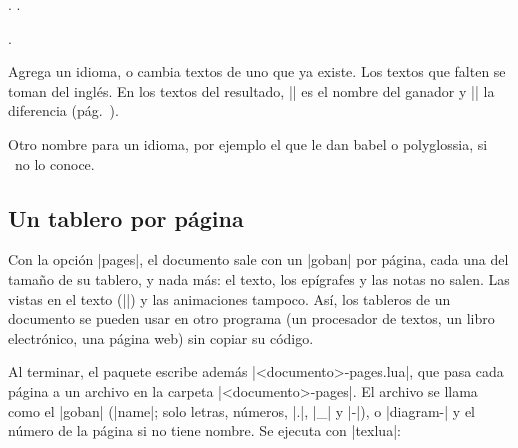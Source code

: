 \begin{goban}[9, stone = {radius = 4pt}, mark = {line = {color = red}}]
\begin{command}{\pgfgotext{}}
	\begin{codeexample}[]
		. .

		.
	\end{codeexample}
\end{command}

\begin{command}{\pgfgodefinelanguage{}}
	Agrega un idioma, o cambia textos de uno que ya existe. Los textos que falten se toman del inglés. En los textos del resultado, |\pgfgowinner| es el nombre del ganador y |\pgfgopoints| la diferencia (pág.~\pageref{subsec:sgfdiagramas}).

	\begin{codeexample}
	\end{codeexample}
\end{command}

\begin{command}{\pgfgolanguagealias{}}
	Otro nombre para un idioma, por ejemplo el que le dan babel o polyglossia, si \pgfgoname\ no lo conoce.

	\begin{codeexample}
	\end{codeexample}
\end{command}

\subsection{Un tablero por página}
\label{subsec:paginas}

Con la opción |pages|, el documento sale con un |goban| por página, cada una del tamaño de su tablero, y nada más: el texto, los epígrafes y las notas no salen. Las vistas en el texto (|\pgfgoview|) y las animaciones tampoco. Así, los tableros de un documento se pueden usar en otro programa (un procesador de textos, un libro electrónico, una página web) sin copiar su código.

Al terminar, el paquete escribe además |<documento>-pages.lua|, que pasa cada página a un archivo en la carpeta |<documento>-pages|. El archivo se llama como el |goban| (|name|; solo letras, números, |.|, |_| y |-|), o |diagram-| y el número de la página si no tiene nombre. Se ejecuta con |texlua|:


\end{goban}
